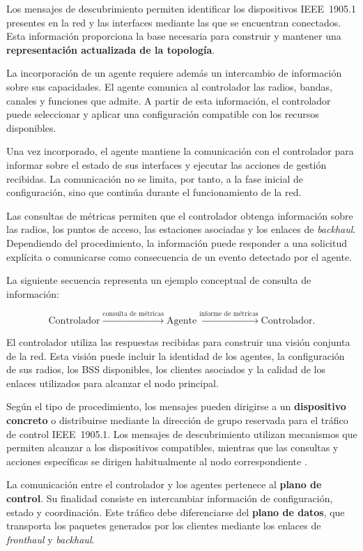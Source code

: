 Los mensajes de descubrimiento permiten identificar los dispositivos
IEEE~1905.1 presentes en la red y las interfaces mediante las que se
encuentran conectados. Esta información proporciona la base necesaria
para construir y mantener una
\textbf{representación actualizada de la topología}.

La incorporación de un agente requiere además un intercambio de
información sobre sus capacidades. El agente comunica al controlador las
radios, bandas, canales y funciones que admite. A partir de esta
información, el controlador puede seleccionar y aplicar una configuración
compatible con los recursos disponibles.

Una vez incorporado, el agente mantiene la comunicación con el
controlador para informar sobre el estado de sus interfaces y ejecutar
las acciones de gestión recibidas. La comunicación no se limita, por
tanto, a la fase inicial de configuración, sino que continúa durante el
funcionamiento de la red.

Las consultas de métricas permiten que el controlador obtenga información
sobre las radios, los puntos de acceso, las estaciones asociadas y los
enlaces de \textit{backhaul}. Dependiendo del procedimiento, la
información puede responder a una solicitud explícita o comunicarse como
consecuencia de un evento detectado por el agente.

La siguiente secuencia representa un ejemplo conceptual de consulta de
información:

\[
    \text{Controlador}
    \xrightarrow{\text{consulta de métricas}}
    \text{Agente}
    \xrightarrow{\text{informe de métricas}}
    \text{Controlador}.
\]

El controlador utiliza las respuestas recibidas para construir una visión
conjunta de la red. Esta visión puede incluir la identidad de los agentes,
la configuración de sus radios, los BSS disponibles, los clientes
asociados y la calidad de los enlaces utilizados para alcanzar el nodo
principal.

Según el tipo de procedimiento, los mensajes pueden dirigirse a un
\textbf{dispositivo concreto} o distribuirse mediante la dirección de
grupo reservada para el tráfico de control IEEE~1905.1. Los mensajes de
descubrimiento utilizan mecanismos que permiten alcanzar a los
dispositivos compatibles, mientras que las consultas y acciones
específicas se dirigen habitualmente al nodo correspondiente
\cite{ieee_1905_1}.

La comunicación entre el controlador y los agentes pertenece al
\textbf{plano de control}. Su finalidad consiste en intercambiar
información de configuración, estado y coordinación. Este tráfico debe
diferenciarse del \textbf{plano de datos}, que transporta los paquetes
generados por los clientes mediante los enlaces de
\textit{fronthaul} y \textit{backhaul}.

